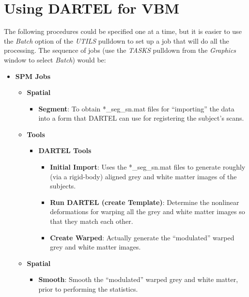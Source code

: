 \section{Using DARTEL for VBM}
The following procedures could be specified one at a time, but it is easier to use the \emph{Batch} option of the \emph{UTILS} pulldown to set up a job that will do all the processing.
The sequence of jobs (use the \emph{TASKS} pulldown from the \emph{Graphics} window to select \emph{Batch}) would be:
\begin{itemize}
\item{{\bf SPM Jobs}
  \begin{itemize}
  \item{{\bf Spatial}
    \begin{itemize}
    \item{{\bf Segment}: To obtain *\_seg\_sn.mat files for ``importing'' the data into a form that DARTEL can use for registering the subject's scans.
    }
    \end{itemize}
  }
  \item{{\bf Tools}
    \begin{itemize}
    \item{{\bf DARTEL Tools}
      \begin{itemize}
      \item{{\bf Initial Import}: Uses the *\_seg\_sn.mat files to generate roughly (via a rigid-body) aligned grey and white matter images of the subjects.
      }
      \item{{\bf Run DARTEL (create Template)}: Determine the nonlinear deformations for warping all the grey and white matter images so that they match each other.
      }
      \item{{\bf Create Warped}: Actually generate the ``modulated'' warped grey and white matter images. 
      }
      \end{itemize}
    }
    \end{itemize}
  }
  \item{{\bf Spatial}
    \begin{itemize}
    \item{{\bf Smooth}: Smooth the ``modulated'' warped grey and white matter, prior to performing the statistics.
    }
    \end{itemize}
  }
  \end{itemize}
}
\end{itemize}


